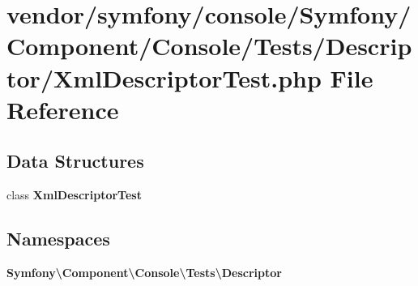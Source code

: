 \section{vendor/symfony/console/\+Symfony/\+Component/\+Console/\+Tests/\+Descriptor/\+Xml\+Descriptor\+Test.php File Reference}
\label{_xml_descriptor_test_8php}
\subsection*{Data Structures}
\begin{DoxyCompactItemize}
\item 
class {\bf Xml\+Descriptor\+Test}
\end{DoxyCompactItemize}
\subsection*{Namespaces}
\begin{DoxyCompactItemize}
\item 
 {\bf Symfony\textbackslash{}\+Component\textbackslash{}\+Console\textbackslash{}\+Tests\textbackslash{}\+Descriptor}
\end{DoxyCompactItemize}
